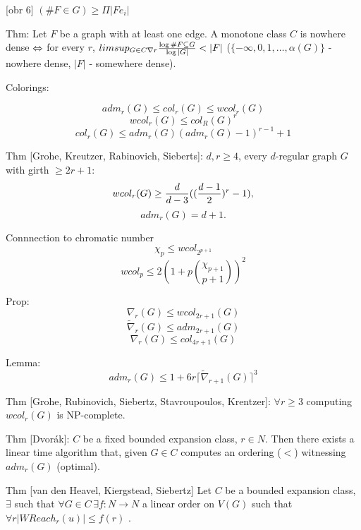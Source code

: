 [obr 6]
$(\# F \in G) \geq \Pi|Fe_i|$

Thm: Let $F$ be a graph with at least one edge. A monotone class $C$ is nowhere dense $\Leftrightarrow$ for every $r$, $limsup_{G \in C\nabla r} {\log \# F \subseteq G \over \log |G|} < |F|$ ($\{-\infty,0,1,\dots,\alpha(G)\}$ - nowhere dense, $|F|$ - somewhere dense).


Colorings:

$$adm_r(G) \leq col_r(G) \leq wcol_r(G)$$
$$wcol_r(G) \leq col_R(G)^r$$
$$col_r(G) \leq adm_r(G)(adm_r(G)-1)^{r-1}+1$$

Thm [Grohe, Kreutzer, Rabinovich, Sieberts]: $d,r \geq 4$, every $d$-regular graph $G$ with girth $\geq 2r+1$: 
$$wcol_r(G) \geq {d \over d-3} (({d-1 \over 2})^r -1),$$
$$adm_r(G) = d+1.$$

Connnection to chromatic number
$$\chi_p \leq wcol_{2^{p+1}}$$
$$wcol_p \leq 2(1+p{\chi_{p+1} \choose p+1})^2$$

Prop:
$$\nabla_r(G) \leq wcol_{2r+1}(G)$$
$$\tilde\nabla_r(G) \leq adm_{2r+1}(G)$$
$$\nabla_r(G) \leq col_{4r+1}(G)$$

Lemma:
$$adm_r(G) \leq 1+6r\lceil \tilde\nabla_{r+1}(G)\rceil^3$$

Thm [Grohe, Rubinovich, Siebertz, Stavroupoulos, Krentzer]: $\forall r\geq 3$ computing $wcol_r(G)$ is NP-complete.

Thm [Dvorák]: $C$  be a fixed bounded expansion class, $r \in N$. Then there exists a linear time algorithm that, given $G \in C$ computes an ordering ($<$) witnessing $adm_r(G)$ (optimal).

Thm [van den Heavel, Kiergstead, Siebertz]
Let $C$ be a bounded expansion class, $\exists $ such that $\forall G\in C\, \exists f:N \rightarrow N$ a linear order on $V(G)$ such that $\forall r |WReach_r(u)|\leq f(r)$ .


\bye
